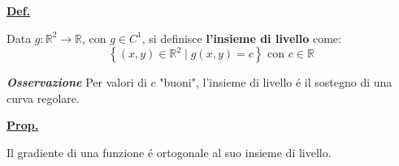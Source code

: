 \documentclass[a4paper,10pt]{article} %
\renewcommand{\b}[1]{%
    {\textbf{#1}}}
\newcommand{\ldef}[1]{%
    {\smallbreak\par\tiny\textbf{\underline{Def.}} {#1} \smallbreak}}
\newcommand{\lprop}[1]{%
    {\smallbreak\par\tiny\textbf{\underline{Prop.}} {#1} \smallbreak}}
\newcommand{\ldim}[1]{%
    {\smallbreak\par\tiny\emph{\textbf{Dimostrazione}} {#1} \par}}
\newcommand{\loss}[1]{%
    {\smallbreak\par\tiny\emph{\textbf{Osservazione}} {#1} \par}}
\renewcommand{\ldim}[1]{{}}
\begin{document}
\begin{multicols}{6}
\ldef{
    Data $g:\mathbb{R}^2 \rightarrow \mathbb{R} $, con $g \in C^1$, 
    si definisce \b{l'insieme di livello} come:
    \[
        \left\{ (x,y) \in \mathbb{R}^2 \mid g(x,y) = c \right\}
        \text{ con } c \in \mathbb{R}
    \]
    \loss{
        Per valori di $c$ "buoni", l'insieme di livello é il sostegno
        di una curva regolare.
    }
}
\lprop{
    Il gradiente di una funzione é ortogonale al suo insieme di livello.

    \ldim{ 
    Lavoriamo prima in $\mathbb{R}^2$, e parametrizziamo la curva
    rappresentante l'insieme di livello:
    \[
        \varnothing : [a, b] \rightarrow \mathbb{R}^2 \quad t \rightarrow
        \begin{cases}
            x(t)\\
            y(t)
        \end{cases}
        \text{ con } Im(\varnothing) = \{ g(x,y) = c \}
    \]
    Il processo é simile a quello di tagliare a "fette" la funzione.\\
    Per costruzione abbiamo che $c = g(x(t), y(t))$.\\
    Se deriviamo rispetto a $t$:
    \[
        \triangledown g(\varnothing(t)) \cdot \varnothing'(t) = 0
    \]
    Che significa che $ \triangledown g$ é ortogonale alla tangente
    in $t$ dell'insieme di livello. (Poiché il prodotto scalare é 0
    solo se i vettori sono ortogonali).\\
    Ora proviamo la stessa identica cosa in $\mathbb{R}^3$.
    Definiamo $g : \mathbb{R}^3 \rightarrow \mathbb{R}$, 
    e il suo insieme di livello $\{ (x,y,z) \mid g(x,y,z) = c \}$.\\
    Questo insieme adesso é rappresentato da una superficie regolare, 
    che parametrizziamo in questo modo:
    \[
        \pi : \mathbb{R}^2 \rightarrow \mathbb{R}^3 \quad
        (s, t) \rightarrow 
        \begin{cases}
            x(s, t)\\
            y(s, t)\\
            z(s, t)
        \end{cases} 
    \]
    Il piano tangente dell'insieme di livello é generato da
    \[
        \left( 
        \frac{\delta x(s,t)}{\delta s}, 
        \frac{\delta y(s,t)}{\delta s}, 
        \frac{\delta z(s,t)}{\delta s}
        \right) \text{ e }
        \left( 
        \frac{\delta x}{\delta t}, 
        \frac{\delta y}{\delta t}, 
        \frac{\delta z}{\delta t}
        \right) 
    \]
    Definiamo $h : \mathbb{R}^2 \rightarrow \mathbb{R}$ come
}}
\end{multicols}
\end{document}
